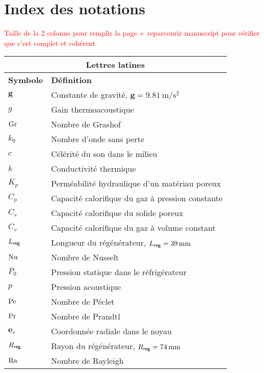\chapter{Index des notations}\label{chap:IndexNotations}%

\textcolor{red}{Taille de la 2\ieme{} colonne pour remplir la page + reparcourir manuscript pour vérifier que c'est complet et cohérent}

\begin{center}
    \begin{tabular}{ll}
        \multicolumn{2}{c}{Lettres latines}  \\\hline
        \textbf{Symbole} & \textbf{Définition} \\\hline\hline
        $\mathbf{g}$ & Constante de gravité, $\mathbf{g}=\qty{9.81}{\meter\per\second\squared}$ \\
        $g$ & Gain thermoacoustique \\
        $\mathrm{Gr}$ & Nombre de Grashof \\
        $k_0$ & Nombre d'onde sans perte \\
        $c$ & Célérité du son dans le milieu \\
        $k$ & Conductivité thermique \\
        $K_p$ & Perméabilité hydraulique d'un matériau poreux \\
        $C_p$ & Capacité calorifique du gaz à pression constante \\
        $C_s$ & Capacité calorifique du solide poreux \\
        $C_v$ & Capacité calorifique du gaz à volume constant \\
        $L_{\sf reg}$ & Longueur du régénérateur, $L_{\sf reg}=\qty{39}{\milli\meter}$ \\
        $\mathrm{Nu}$ & Nombre de Nusselt \\
        $P_0$ & Pression statique dans le réfrigérateur \\
        $p$ & Pression acoustique \\
        $\mathrm{Pe}$ & Nombre de Péclet \\
        $\mathrm{Pr}$ & Nombre de Prandtl \\
        $\mathbf{e}_r$ & Coordonnée radiale dans le noyau \\
        $R_{\sf reg}$ & Rayon du régénérateur, $R_{\sf reg}=\qty{74}{\milli\meter}$ \\
        $\mathrm{Ra}$ & Nombre de Rayleigh \\

\end{tabular}
\end{center}
